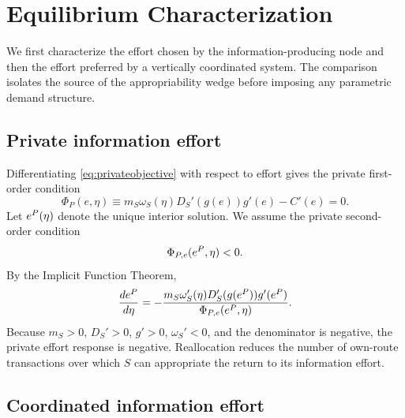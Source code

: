 \section{Equilibrium Characterization}\label{sec:equilibrium}

We first characterize the effort chosen by the information-producing node and then the effort preferred by a vertically coordinated system. The comparison isolates the source of the appropriability wedge before imposing any parametric demand structure.

\subsection{Private information effort}

Differentiating \eqref{eq:privateobjective} with respect to effort gives the private first-order condition
\begin{equation}
    \Phi_P(e,\eta)
    \equiv
    m_S\omega_S(\eta)D_S'(g(e))g'(e)-C'(e)=0.
    \label{eq:privatefoc}
\end{equation}
Let $e^{P}(\eta)$ denote the unique interior solution. We assume the private second-order condition
\begin{equation}
    \Phi_{P,e}(e^{P},\eta)<0.
    \label{eq:privatesoc}
\end{equation}
By the Implicit Function Theorem,
\begin{equation}
    \frac{de^{P}}{d\eta}
    =-
    \frac{m_S\omega_S'(\eta)D_S'(g(e^{P}))g'(e^{P})}
    {\Phi_{P,e}(e^{P},\eta)}.
    \label{eq:privateift}
\end{equation}
Because $m_S>0$, $D_S'>0$, $g'>0$, $\omega_S'<0$, and the denominator is negative, the private effort response is negative. Reallocation reduces the number of own-route transactions over which $S$ can appropriate the return to its information effort.

\subsection{Coordinated information effort}


